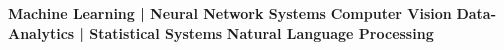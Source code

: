 

\begin{cvparagraph}

 \textbf{Machine Learning | Neural Network Systems}
 \newline
 \textbf{Computer Vision}
\newline
 \textbf{Data-Analytics | Statistical Systems}  
 \newline
 \textbf{Natural Language Processing}
 \end{cvparagraph}